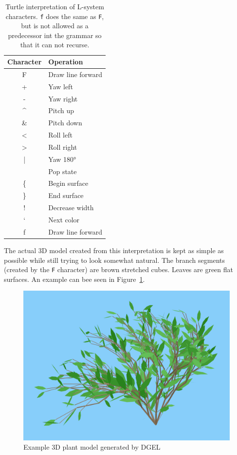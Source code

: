 \begin{table}
    \centering
    \begin{tabular}{| c | l |}
    \hline
    \textbf{Character} & \textbf{Operation} \\ \hline
    F & Draw line forward \\ \hline
    + & Yaw left \\ \hline
    - & Yaw right \\ \hline
    \textasciicircum & Pitch up \\ \hline
    \& & Pitch down \\ \hline
    < & Roll left \\ \hline
    > & Roll right \\ \hline
    | & Yaw 180° \\ \hline
    [ & Push state \\ \hline
    ] & Pop state \\ \hline
    \{ & Begin surface \\ \hline
    \} & End surface \\ \hline
    ! & Decrease width \\ \hline
    ` & Next color \\ \hline
    f & Draw line forward \\
    \hline
    \end{tabular}
    \caption[Turtle interpretation of L-system characters]{Turtle interpretation of \gls{L-system} characters. \texttt{f} does the same as \texttt{F}, but is not allowed as a predecessor int the grammar so that it can not recurse.}
    \label{tab:turtle-cmd}
\end{table}

The actual 3D model created from this interpretation is kept as simple as possible while still trying to look somewhat natural.
The \glspl{branch segment} (created by the \texttt{F} character) are brown stretched cubes.
Leaves are green flat surfaces.
An example can bee seen in Figure~\ref{fig:example-model}.

\begin{figure}
    \centering
    \includegraphics[width=1.0\textwidth]{figures/example-plant}
    \caption[Example 3D plant model generated by DGEL]{Example 3D plant model generated by \gls{DGEL}}
    \label{fig:example-model}
\end{figure}

